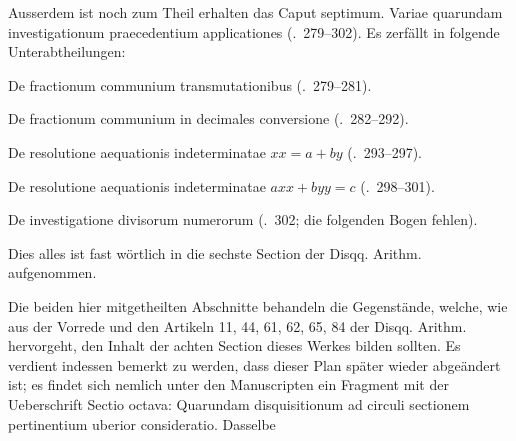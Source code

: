 Ausserdem ist noch zum Theil erhalten das Caput septimum. Variae quarundam investigationum praecedentium applicationes (\textsection\textsection.\ 279--302). Es zerfällt in folgende Unterabtheilungen:

De fractionum communium transmutationibus (\textsection\textsection.\ 279--281).

De fractionum communium in decimales conversione (\textsection\textsection.\ 282--292).

De resolutione aequationis indeterminatae $xx=a+by$ (\textsection\textsection.\ 293--297).

De resolutione aequationis indeterminatae $axx+byy=c$ (\textsection\textsection.\ 298--301).

De investigatione divisorum numerorum (\textsection.\ 302; die folgenden Bogen fehlen).

Dies alles ist fast wörtlich in die sechste Section der Disqq. Arithm. aufgenommen.

Die beiden hier mitgetheilten Abschnitte behandeln die Gegenstände, welche, wie aus der Vorrede und den Artikeln 11, 44, 61, 62, 65, 84 der Disqq. Arithm. hervorgeht, den Inhalt der achten Section dieses Werkes bilden sollten. Es verdient indessen bemerkt zu werden, dass dieser Plan später wieder abgeändert ist; es findet sich nemlich unter den Manuscripten ein Fragment mit der Ueberschrift Sectio octava: Quarundam disquisitionum ad circuli sectionem pertinentium uberior consideratio. Dasselbe 
